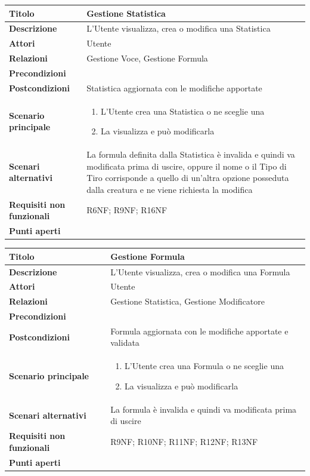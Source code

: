 \documentclass[a4paper, 11pt]{article}
\begin{document}
\begin{center}
\vspace{3em}

\begin{tabular}{ |p{5cm}|p{9.5cm}|  }
\hline
\textbf{Titolo} & Gestione Statistica \\
\hline
\textbf{Descrizione} & L'Utente visualizza, crea o modifica una Statistica \\
\hline
\textbf{Attori} & Utente  \\
\hline
\textbf{Relazioni} & Gestione Voce, Gestione Formula \\
\hline
\textbf{Precondizioni} &  \\
\hline
\textbf{Postcondizioni} & Statistica aggiornata con le modifiche apportate \\
\hline
\textbf{Scenario principale} & 
\begin{enumerate}
    \item L'Utente crea una Statistica o ne sceglie una
    \item La visualizza e può modificarla
\end{enumerate}
\\
\hline
\textbf{Scenari alternativi} &La formula definita dalla Statistica è invalida e quindi va modificata prima di uscire, oppure il nome o il Tipo di Tiro corrisponde a quello di un'altra opzione posseduta dalla creatura e ne viene richiesta la modifica \\
\hline
    \textbf{Requisiti non funzionali} & R6NF; R9NF; R16NF \\
\hline
\textbf{Punti aperti} &  \\
\hline
\end{tabular}

\vspace{3em}

\begin{tabular}{ |p{5cm}|p{9.5cm}|  }
\hline
\textbf{Titolo} & Gestione Formula \\
\hline
\textbf{Descrizione} & L'Utente visualizza, crea o modifica una Formula \\
\hline
\textbf{Attori} & Utente  \\
\hline
\textbf{Relazioni} & Gestione Statistica, Gestione Modificatore \\
\hline
\textbf{Precondizioni} &  \\
\hline
\textbf{Postcondizioni} & Formula aggiornata con le modifiche apportate e validata \\
\hline
\textbf{Scenario principale} & 
\begin{enumerate}
    \item L'Utente crea una Formula o ne sceglie una
    \item La visualizza e può modificarla
\end{enumerate}
\\
\hline
\textbf{Scenari alternativi} &La formula è invalida e quindi va modificata prima di uscire \\
\hline
    \textbf{Requisiti non funzionali} & R9NF; R10NF; R11NF; R12NF; R13NF\\
\hline
\textbf{Punti aperti} &  \\
\hline
\end{tabular}


\end{center}
\end{document}
